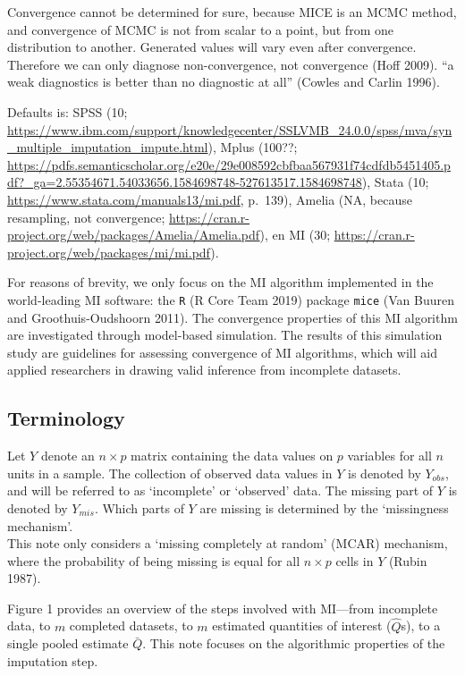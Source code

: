 \documentclass[
  Royal, times, sageapa]{sagej}
\begin{document}
Convergence cannot be determined for sure, because MICE is an MCMC
method, and convergence of MCMC is not from scalar to a point, but from
one distribution to another. Generated values will vary even after
convergence. Therefore we can only diagnose non-convergence, not
convergence (Hoff 2009). ``a weak diagnostics is better than no
diagnostic at all'' (Cowles and Carlin 1996).

Defaults is: SPSS (10;
\url{https://www.ibm.com/support/knowledgecenter/SSLVMB_24.0.0/spss/mva/syn_multiple_imputation_impute.html}),
Mplus (100??;
\url{https://pdfs.semanticscholar.org/e20e/29e008592cbfbaa567931f74cdfdb5451405.pdf?_ga=2.55354671.54033656.1584698748-527613517.1584698748}),
Stata (10; \url{https://www.stata.com/manuals13/mi.pdf}, p.~139), Amelia
(NA, because resampling, not convergence;
\url{https://cran.r-project.org/web/packages/Amelia/Amelia.pdf}), en MI
(30; \url{https://cran.r-project.org/web/packages/mi/mi.pdf}).

For reasons of brevity, we only focus on the MI algorithm implemented in
the world-leading MI software: the \texttt{R} (R Core Team 2019) package
\texttt{mice} (Van Buuren and Groothuis-Oudshoorn 2011). The convergence
properties of this MI algorithm are investigated through model-based
simulation. The results of this simulation study are guidelines for
assessing convergence of MI algorithms, which will aid applied
researchers in drawing valid inference from incomplete datasets.

\hypertarget{terminology}{%
\subsection{Terminology}\label{terminology}}

Let \(Y\) denote an \(n \times p\) matrix containing the data values on
\(p\) variables for all \(n\) units in a sample. The collection of
observed data values in \(Y\) is denoted by \(Y_{obs}\), and will be
referred to as `incomplete' or `observed' data. The missing part of
\(Y\) is denoted by \(Y_{mis}\). Which parts of \(Y\) are missing is
determined by the `missingness mechanism'.\\
This note only considers a `missing completely at random' (MCAR)
mechanism, where the probability of being missing is equal for all
\(n \times p\) cells in \(Y\) (Rubin 1987).

Figure 1 provides an overview of the steps involved with MI---from
incomplete data, to \(m\) completed datasets, to \(m\) estimated
quantities of interest (\(\hat{Q}\)s), to a single pooled estimate
\(\bar{Q}\). This note focuses on the algorithmic properties of the
imputation step.
\end{document}
